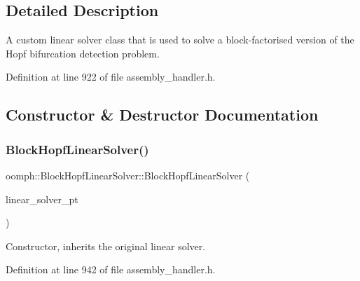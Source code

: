 \subsection{Detailed Description}
A custom linear solver class that is used to solve a block-\/factorised version of the Hopf bifurcation detection problem. 

Definition at line 922 of file assembly\+\_\+handler.\+h.



\subsection{Constructor \& Destructor Documentation}
\mbox{\label{classoomph_1_1BlockHopfLinearSolver_ab8257cd5a04b20ae0d5e53ee1f9e2abd}} 
\subsubsection{\texorpdfstring{Block\+Hopf\+Linear\+Solver()}{BlockHopfLinearSolver()}}
{\footnotesize\ttfamily oomph\+::\+Block\+Hopf\+Linear\+Solver\+::\+Block\+Hopf\+Linear\+Solver (\begin{DoxyParamCaption}\item[{\hyperlink{classoomph_1_1LinearSolver}{Linear\+Solver} $\ast$const}]{linear\+\_\+solver\+\_\+pt }\end{DoxyParamCaption})\hspace{0.3cm}{\ttfamily [inline]}}



Constructor, inherits the original linear solver. 



Definition at line 942 of file assembly\+\_\+handler.\+h.

\mbox{\label{classoomph_1_1BlockHopfLinearSolver_a7a77bcca3b3018995f644fff39c7a957}} 
